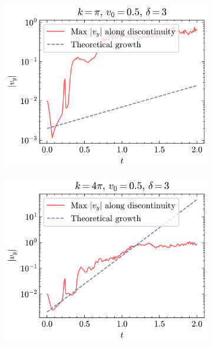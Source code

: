 \documentclass{article}
\begin{document}
\begin{figure}[htbp]
    \centering
    \begin{subfigure}{0.31\textwidth}
        \centering
        \includegraphics[width=\textwidth]{images/kh_growth_k1.png}
        \caption{}
    \end{subfigure}
    \hfill
    \begin{subfigure}{0.31\textwidth}
        \centering
        \includegraphics[width=\textwidth]{images/kh_growth_k4.png}
        \caption{}
    \end{subfigure}

\end{figure}
\end{document}

